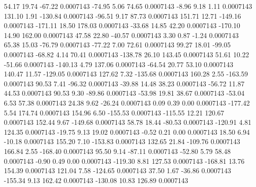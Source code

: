       54.17       19.74      -67.22     0.0007143
      -74.95        5.06       74.65     0.0007143
       -8.96        9.18        1.11     0.0007143
      131.10        1.91     -130.84     0.0007143
      -96.51        9.17       87.73     0.0007143
      151.71       12.71     -149.16     0.0007143
     -171.11       18.50      178.03     0.0007143
      -33.68       14.85       42.20     0.0007143
     -170.10       14.90      162.00     0.0007143
       47.58       22.80      -40.57     0.0007143
        3.30        0.87       -1.24     0.0007143
       65.38       15.03      -76.79     0.0007143
      -77.22        7.00       72.61     0.0007143
       99.27       18.01      -99.05     0.0007143
      -68.82        4.14       70.41     0.0007143
     -138.78       26.10      143.45     0.0007143
       51.61       10.22      -51.66     0.0007143
     -140.13        4.79      137.06     0.0007143
      -64.54       20.77       53.10     0.0007143
      140.47       11.57     -129.05     0.0007143
      127.62        7.32     -135.68     0.0007143
      160.28        2.55     -163.59     0.0007143
       90.53        7.41      -96.32     0.0007143
      -39.88       14.48       38.23     0.0007143
      -56.72       11.87       44.53     0.0007143
       90.53        9.30      -89.86     0.0007143
      -53.98       19.81       38.67     0.0007143
      -53.04        6.53       57.38     0.0007143
       24.38        9.62      -26.24     0.0007143
        0.09        0.39        0.00     0.0007143
     -177.42        5.54      174.74     0.0007143
      154.96        6.50     -155.53     0.0007143
     -115.55       12.21      120.67     0.0007143
      152.44        9.67     -149.68     0.0007143
       58.78       18.44      -80.53     0.0007143
     -120.91        4.81      124.35     0.0007143
      -19.75        9.13       19.02     0.0007143
       -0.52        0.21        0.00     0.0007143
       18.50        6.94      -10.18     0.0007143
      155.20        7.10     -153.83     0.0007143
      132.65       21.84     -109.76     0.0007143
      166.84        2.55     -168.40     0.0007143
       95.50        9.14      -87.11     0.0007143
      -52.80        5.79       58.48     0.0007143
       -0.90        0.49        0.00     0.0007143
     -119.30        8.81      127.53     0.0007143
     -168.81       13.76      154.39     0.0007143
      121.04        7.58     -124.65     0.0007143
       37.50        1.67      -36.86     0.0007143
     -155.34        9.13      162.42     0.0007143
     -130.08       10.83      126.89     0.0007143

